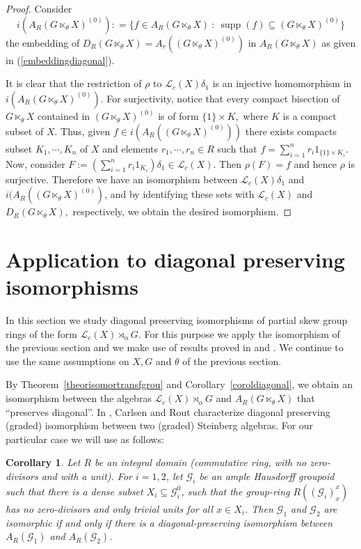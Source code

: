 \documentclass[11pt, a4paper]{amsart}
\newcommand{\G}{\ensuremath {\mathcal{G}}}
\newcommand{\Gx}{\ensuremath {G \ltimes_\theta X}}
\newcommand{\Lc}{\ensuremath {\mathcal{L}_c(X)}}
\newcommand{\Lg}{\ensuremath {\mathcal{L}_c(X)\rtimes_{\alpha} G}}
\newcommand{\an}[1]{``#1''} %
\DeclareMathOperator{\supp}{supp}
\theoremstyle{plain}
\newtheorem{corollary}[theorem]{Corollary}
\begin{document}
\begin{proof}
Consider 
$$i(A_R(\Gx)^{(0)}): = \{f \in A_R(\Gx) \ : \ \supp(f) \subseteq (\Gx)^{(0)} \}$$ 
the embedding of $D_R(\Gx)= A_r((\Gx)^{(0)})$ in $A_R(\Gx)$ as given in (\ref{embeddingdiagonal}).

It is clear that the restriction of $\rho$ to $\Lc \delta_1$ is an injective homomorphism in $i(A_R(\Gx)^{(0)}).$
For surjectivity, notice that every compact bisection of $\Gx$ contained in $(\Gx)^{(0)}$ is of form $\{1\} \times K,$ where $K$ is a compact subset of  $X.$ Thus, given $f \in i(A_R((\Gx)^{(0)}))$ there exists compacts subset $K_1, \cdots, K_n$ of $X$ and elements $r_1, \cdots, r_n \in R $ such that  $f=\sum_{i=1}^n r_i1_{\{1\}\times K_i}.$ Now, consider  $F:= \left( \sum_{i=1}^n r_i1_{K_i} \right) \delta_1 \in \Lc.$  Then $\rho(F)=f$ and hence $\rho$ is surjective. Therefore we have an isomorphism between $\Lc\delta_1$ and $i(A_R((\Gx)^{(0)})$, and by identifying these sets with $\Lc$ and $D_R(\Gx),$ respectively, we obtain the desired isomorphism.
\end{proof}


\section{Application to diagonal preserving isomorphisms}


In this section we study diagonal preserving isomorphisms of partial skew group rings of the form $\Lg$. For this purpose we apply the isomorphism of the previous section and we make use of results proved in \cite{James} and \cite{Xin}.
We continue to use the same assumptions on $X, G$ and $\theta$ of the previous section. 

By Theorem~\ref{theorisomortransfgrou} and Corollary~\ref{coroldiagonal}, we obtain an isomorphism between the algebras $\Lg$ and $A_R(\Gx)$ that \an{preserves diagonal}. In \cite[Theorem 3.1.]{James}, Carlsen and Rout characterize diagonal preserving (graded) isomorphism between two (graded) Steinberg algebras. For our particular case we will use \cite[Corollary~3.2]{James} as follows:


\begin{corollary}\label{steinbdiagonal}
Let $R$ be an integral domain (commutative ring, with no zero-divisors and with a unit). For $i=1,2$, let $\G_i$ be an ample Hausdorff groupoid such that there is a dense subset $X_i \subseteq \G_i^0$, such that the group-ring $R((\G_i)_x^x)$ has no zero-divisors and only trivial units for all $x \in X_i$. Then $\G_1$ and $\G_2$ are isomorphic if and only if there is a diagonal-preserving isomorphism between $A_R(\G_1)$ and $A_R(\G_2)$.
\end{corollary}
\end{document}
